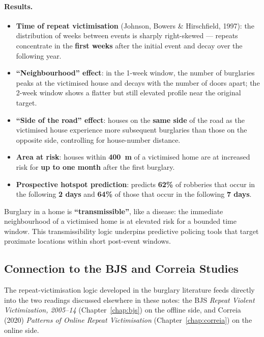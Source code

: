 \documentclass[11pt,a4paper,openany]{report}
\theoremstyle{definition}
\theoremstyle{plain}
\theoremstyle{remark}
\begin{document}
\paragraph{Results.}
\begin{itemize}
    \item \textbf{Time of repeat victimisation} (Johnson, Bowers \& Hirschfield, 1997): the distribution of weeks between events is sharply right-skewed --- repeats concentrate in the \textbf{first weeks} after the initial event and decay over the following year.
    \item \textbf{``Neighbourhood'' effect}: in the 1-week window, the number of burglaries peaks at the victimised house and decays with the number of doors apart; the 2-week window shows a flatter but still elevated profile near the original target.
    \item \textbf{``Side of the road'' effect}: houses on the \textbf{same side} of the road as the victimised house experience more subsequent burglaries than those on the opposite side, controlling for house-number distance.
    \item \textbf{Area at risk}: houses within \textbf{400~m} of a victimised home are at increased risk for \textbf{up to one month} after the first burglary.
    \item \textbf{Prospective hotspot prediction}: predicts \textbf{62\%} of robberies that occur in the following \textbf{2 days} and \textbf{64\%} of those that occur in the following \textbf{7 days}.
\end{itemize}

\begin{keypoint}
Burglary in a home is \textbf{``transmissible''}, like a disease: the immediate neighbourhood of a victimised home is at elevated risk for a bounded time window. This transmissibility logic underpins predictive policing tools that target proximate locations within short post-event windows.
\end{keypoint}

\subsection{Connection to the BJS and Correia Studies}

The repeat-victimisation logic developed in the burglary literature feeds directly into the two readings discussed elsewhere in these notes: the BJS \textit{Repeat Violent Victimization, 2005--14} (Chapter~\ref{chap:bjs}) on the offline side, and Correia (2020) \textit{Patterns of Online Repeat Victimisation} (Chapter~\ref{chap:correia}) on the online side.
\end{document}
